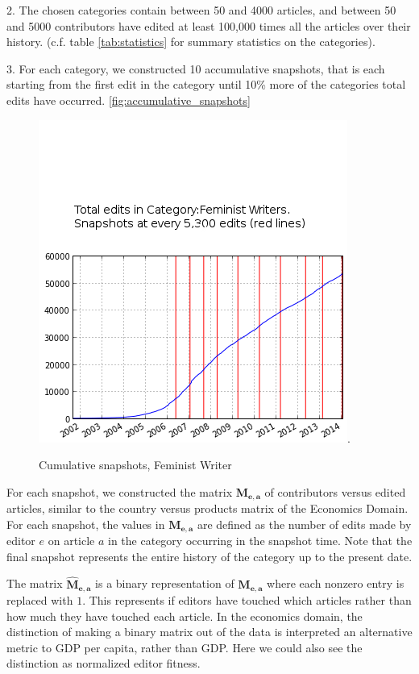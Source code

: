 \documentclass{acm_proc_article-sp}
\begin{document}
2. The chosen categories contain between 50 and 4000 articles, and between 50 and 5000 contributors have edited at least 100,000 times all the articles over their history. (c.f. table \ref{tab:statistics} for summary statistics on the categories). 

3. For each category, we constructed 10 accumulative snapshots, that is each starting from the first edit in the category until 10\% more of the categories total edits have occurred. \ref{fig:accumulative_snapshots}

\begin{figure}[!t]
\centering
\includegraphics[width=0.9\columnwidth]{accumulative snapshot points for Feminist Writers.png}.
\caption{Cumulative snapshots, Feminist Writer}
\label{fig:cumsnaps}
\end{figure}

 For each snapshot, we constructed the matrix $\mathbf{M_{e,a}}$ of contributors versus edited articles, similar to the country versus products matrix of the Economics Domain. For each snapshot, the values in $\mathbf{M_{e,a}}$ are defined as the number of edits made by editor $e$ on article $a$ in the category occurring in the snapshot time. Note that the final snapshot represents the entire history of the category up to the present date.


 
The matrix $\mathbf{\hat{M}_{e,a}}$ is a binary representation of $\mathbf{M_{e,a}}$ where each nonzero entry is replaced with $1$. This represents if editors have touched which articles rather than how much they have touched each article. In the economics domain, the distinction of making a binary matrix out of the data is interpreted an alternative metric to GDP per capita, rather than GDP. Here we could also see the distinction as normalized editor fitness.
\end{document}
